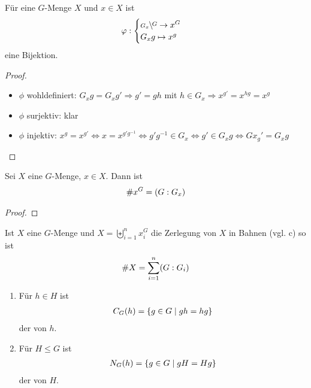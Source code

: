 \begin{lemma}
	Für eine $G$-Menge $X$ und $x\in X$ ist
	\begin{align}
		\phi:\begin{cases}
			\rnkset{G}{G_x}\to x^G \\ G_xg\mapsto x^g
		\end{cases}\notag
	\end{align}
	eine Bijektion.
\end{lemma}
\begin{proof}
	\begin{itemize}
		\item $\phi$ wohldefiniert: $G_xg=G_xg'\Rightarrow g'=gh$ mit $h\in G_x\Rightarrow x^{g'}=x^{hg}=x^g$
		\item $\phi$ surjektiv: klar
		\item $\phi$ injektiv: $x^g=x^{g'}\Leftrightarrow x=x^{g'g^{-1}}\Leftrightarrow g'g^{-1}\in G_x\Leftrightarrow g'\in G_xg\Leftrightarrow Gx_g'=G_xg$
	\end{itemize}
\end{proof}

\begin{proposition}
	Sei $X$ eine $G$-Menge, $x\in X$. Dann ist
	\begin{align}
		\# x^G = (G:G_x) \notag
	\end{align}
\end{proposition}
\begin{proof}
\end{proof}

\begin{conclusion}[Bahngleichung]
	Ist $X$ eine $G$-Menge und $X=\biguplus_{i=1}^n x_i^G$ die Zerlegung von $X$ in Bahnen (vgl.  c) so ist
	\begin{align}
		\# X= \sum_{i=1}^{n} (G:G_i)\notag
	\end{align}
\end{conclusion}

\begin{definition}
	\begin{enumerate}[label=(\alph*)]
		\item Für $h\in H$ ist 
		\begin{align}
			C_G(h) = \{g\in G\mid gh=hg\}\notag
		\end{align}
		der  von $h$.
		\item Für $H\le G$ ist 
		\begin{align}
		N_G(h) = \{g\in G\mid gH=Hg\}\notag
		\end{align}
		der  von $H$.
	\end{enumerate}
\end{definition}

